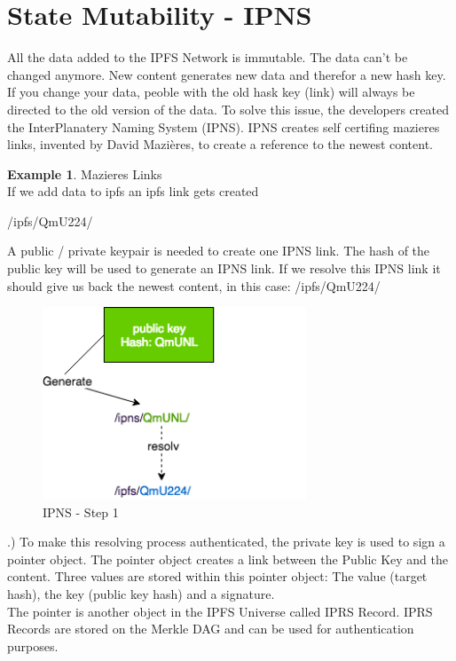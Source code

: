 \documentclass[a4paper,11pt, oneside]{report}
\theoremstyle{definition}
\newtheorem{exmp}{Example}[subsection]
\begin{document}
\newpage
\section{State Mutability - IPNS}
All the data added to the IPFS Network is immutable. The data can't be changed anymore. New content generates new data and therefor a new hash key. If you change your data, peoble with the old hask key (link) will always be directed to the old version of the data. To solve this issue, the developers created the InterPlanatery Naming System (IPNS). IPNS creates self certifing mazieres links, invented by David Mazières, to create a reference to the newest content.
\begin{exmp}{Mazieres Links}\\
If we add data to ipfs an ipfs link gets created
\begin{center}
	/ipfs/QmU224/
\end{center}
A public / private keypair is needed to create one IPNS link.  The hash of the public key will be used to generate an IPNS link. If we resolve this IPNS link it should give us back the newest content, in this case: /ipfs/QmU224/
\begin{figure}[H]
\centering
\includegraphics[width=0.7\textwidth]{img/ipns-1.png}
\caption[IPNS Step 1]{IPNS - Step 1}
\end{figure}
\newpage
{}.) To make this resolving process authenticated, the private key is used to sign a pointer object. The pointer object creates a link between the Public Key and the content. Three values are stored within this pointer object: The value (target hash), the key (public key hash) and a signature.\\
The pointer is another object in the IPFS Universe called IPRS Record. IPRS Records are stored on the Merkle DAG and can be used for authentication purposes.
\begin{figure}[H]

\end{figure}
\end{exmp}
\end{document}

